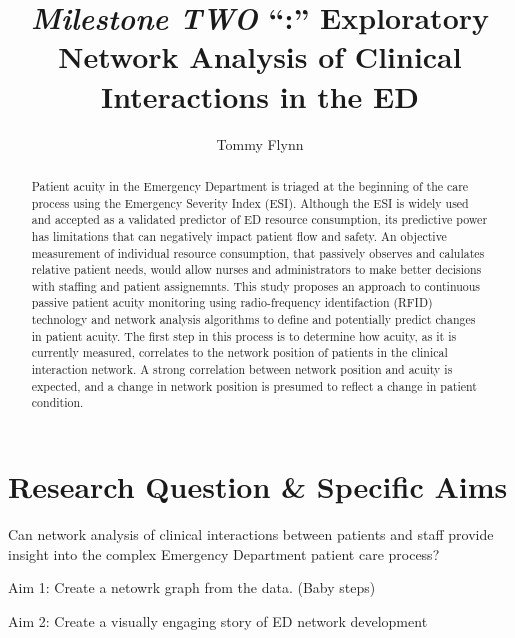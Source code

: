 \documentclass[]{elsarticle} %
\begin{document}
\begin{frontmatter}

  \title{\emph{Milestone TWO} ``:'' Exploratory Network Analysis of Clinical
Interactions in the ED}
    \author[Emory University]{Tommy Flynn}
      \address[Emory University]{Find the GitHub repository for this Milestone at
\url{https://github.com/tommyflynn/Flynn_N741_Project/tree/master/Flynn_Project}}
  
  \begin{abstract}
  Patient acuity in the Emergency Department is triaged at the beginning
  of the care process using the Emergency Severity Index (ESI). Although
  the ESI is widely used and accepted as a validated predictor of ED
  resource consumption, its predictive power has limitations that can
  negatively impact patient flow and safety. An objective measurement of
  individual resource consumption, that passively observes and calulates
  relative patient needs, would allow nurses and administrators to make
  better decisions with staffing and patient assignemnts. This study
  proposes an approach to continuous passive patient acuity monitoring
  using radio-frequency identifaction (RFID) technology and network
  analysis algorithms to define and potentially predict changes in patient
  acuity. The first step in this process is to determine how acuity, as it
  is currently measured, correlates to the network position of patients in
  the clinical interaction network. A strong correlation between network
  position and acuity is expected, and a change in network position is
  presumed to reflect a change in patient condition.
  \end{abstract}
  
 \end{frontmatter}

\section{Research Question \& Specific
Aims}\label{research-question-specific-aims}

Can network analysis of clinical interactions between patients and staff
provide insight into the complex Emergency Department patient care
process?

Aim 1: Create a netowrk graph from the data. (Baby steps)

Aim 2: Create a visually engaging story of ED network development
\end{document}
